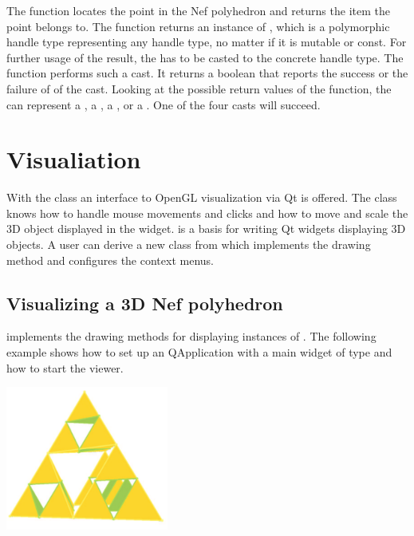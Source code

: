 The  function locates the point  in the
Nef polyhedron and returns the item the point belongs to. The
 function returns an instance of ,
which is a polymorphic handle type representing any handle type, no
matter if it is mutable or const.  For further usage of the result,
the  has to be casted to the concrete handle type.
The  function performs such a cast. It returns a
boolean that reports the success or the failure of of the cast.
Looking at the possible return values of the  function,
the  can represent a , a
, a , or a
. One of the four casts will succeed.


\section{Visualiation}

With the  class an interface to OpenGL
visualization via Qt is offered. The class knows how to handle
mouse movements and clicks and how to move and scale the 
3D object displayed in the widget.  is
a basis for writing Qt widgets displaying 3D objects. 
A user can derive a new class from  
which implements the drawing method and configures the context menus.

\subsection{Visualizing a 3D Nef polyhedron}

 implements the drawing methods for displaying 
instances of
. The following example shows how to set up 
an QApplication with a main widget of type  and
how to start the viewer.

\begin{ccTexOnly}
    \begin{center}
      \parbox{0.4\textwidth}{%
          \includegraphics[width=0.4\textwidth]{Nef_3/fig/visualization_SNC}%
      }
    \end{center}
\end{ccTexOnly}

